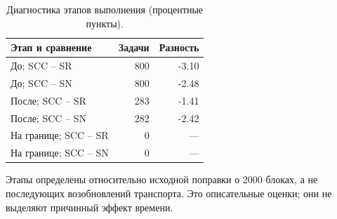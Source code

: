 \begin{table}[htbp]\centering\small
\caption{Диагностика этапов выполнения (процентные пункты).}
\label{tab:scc2000-timing}
\begin{tabular}{lrr}\toprule
Этап и сравнение & Задачи & Разность\\\midrule
До; SCC -- SR & 800 & -3.10\\
До; SCC -- SN & 800 & -2.48\\
После; SCC -- SR & 283 & -1.41\\
После; SCC -- SN & 282 & -2.42\\
На границе; SCC -- SR & 0 & ---\\
На границе; SCC -- SN & 0 & ---\\
\bottomrule\end{tabular}
\par\smallskip\noindent Этапы определены относительно исходной поправки о 2000 блоках, а не последующих возобновлений транспорта. Это описательные оценки; они не выделяют причинный эффект времени.
\end{table}
